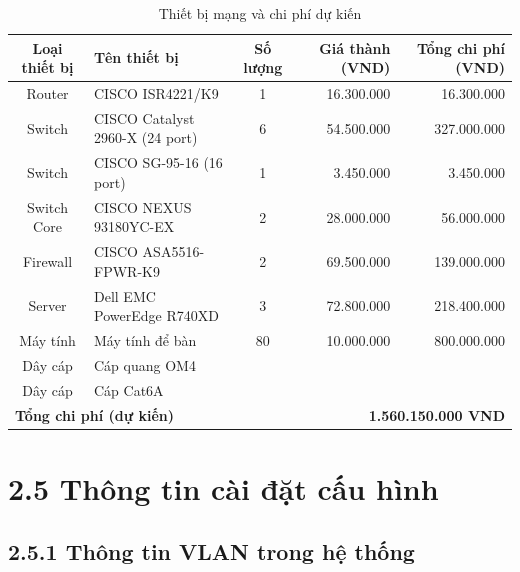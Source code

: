\begin{table}[htbp]
\centering
\begin{tabular}{|c|l|c|r|r|}
\hline
\textbf{Loại thiết bị} &\textbf{Tên thiết bị} & \textbf{Số lượng} & \textbf{Giá thành (VND)} & \textbf{Tổng chi phí (VND)} \\
\hline
Router & CISCO ISR4221/K9 & 1 & 16.300.000 & 16.300.000\\
\hline
Switch & CISCO Catalyst 2960-X (24 port)& 6 & 54.500.000 & 327.000.000 \\
\hline
Switch & CISCO SG-95-16 (16 port) & 1 & 3.450.000 & 3.450.000\\
\hline
Switch Core & CISCO NEXUS 93180YC-EX & 2 & 28.000.000 & 56.000.000 \\
\hline
Firewall & CISCO ASA5516-FPWR-K9 & 2 & 69.500.000 & 139.000.000 \\
\hline
Server & Dell EMC PowerEdge R740XD & 3 & 72.800.000 & 218.400.000 \\
\hline
Máy tính & Máy tính để bàn & 80 & 10.000.000 & 800.000.000 \\
\hline
Dây cáp & Cáp quang OM4 & &  &  \\
\hline
Dây cáp & Cáp Cat6A &  &  & \\
\hline
\multicolumn{3}{|l|}{\textbf{Tổng chi phí (dự kiến)}} & \multicolumn{2}{r|}{\textbf{1.560.150.000 VND}} \\
\hline
\end{tabular}
\caption{Thiết bị mạng và chi phí dự kiến}
\end{table}

\section*{2.5 Thông tin cài đặt cấu hình}

\subsection*{2.5.1 Thông tin VLAN trong hệ thống}

